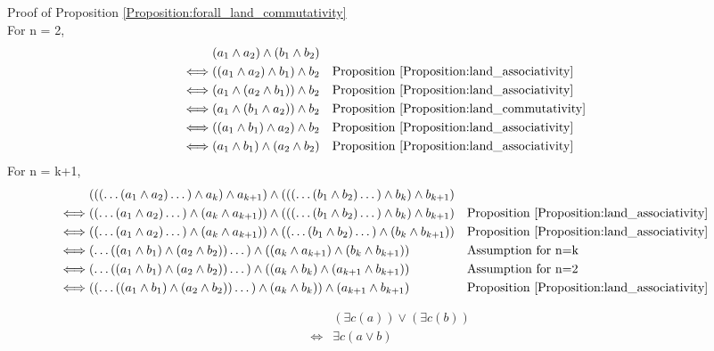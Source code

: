 Proof of Proposition \ref{Proposition:forall_land_commutativity} \\
For n = 2,
\begin{align*}
& (a_1 \land a_2) \land (b_1 \land b_2) \\
\iff & ((a_1 \land a_2) \land b_1) \land b_2
& & \text{Proposition \ref{Proposition:land_associativity}} \\
\iff & (a_1 \land (a_2 \land b_1)) \land b_2
& & \text{Proposition \ref{Proposition:land_associativity}} \\
\iff & (a_1 \land (b_1 \land a_2)) \land b_2
& & \text{Proposition \ref{Proposition:land_commutativity}} \\
\iff & ((a_1 \land b_1) \land a_2) \land b_2
& & \text{Proposition \ref{Proposition:land_associativity}} \\
\iff & (a_1 \land b_1) \land (a_2 \land b_2)
& & \text{Proposition \ref{Proposition:land_associativity}} \\
\end{align*}
For n = k+1,
\begin{align*}
& ((( \dots (a_1 \land a_2) \dots ) \land a_k) \land a_{k+1}) \land ((( \dots (b_1 \land b_2) \dots ) \land b_k ) \land b_{k+1}) \\
\iff & (( \dots (a_1 \land a_2) \dots ) \land (a_k \land a_{k+1})) \land ((( \dots (b_1 \land b_2) \dots ) \land b_k ) \land b_{k+1})
& & \text{Proposition \ref{Proposition:land_associativity}} \\
\iff & (( \dots (a_1 \land a_2) \dots ) \land (a_k \land a_{k+1})) \land (( \dots (b_1 \land b_2) \dots ) \land (b_k \land b_{k+1}))
& & \text{Proposition \ref{Proposition:land_associativity}} \\
\iff & ( \dots ((a_1 \land b_1) \land (a_2 \land b_2)) \dots ) \land ((a_k \land a_{k+1}) \land (b_k \land b_{k+1}))
& & \text{Assumption for n=k} \\
\iff & ( \dots ((a_1 \land b_1) \land (a_2 \land b_2)) \dots ) \land ((a_k \land b_k) \land (a_{k+1} \land b_{k+1}))
& & \text{Assumption for n=2} \\
\iff & (( \dots ((a_1 \land b_1) \land (a_2 \land b_2)) \dots ) \land (a_k \land b_k)) \land (a_{k+1} \land b_{k+1})
& & \text{Proposition \ref{Proposition:land_associativity}} \\
\end{align*}

\begin{prop}
\label{Proposition:exists_lor_commutativity}
\begin{align*}
& (\exists c (a)) \lor (\exists c (b)) \\
\iff & \exists c (a \lor b)
\end{align*}
\end{prop}

